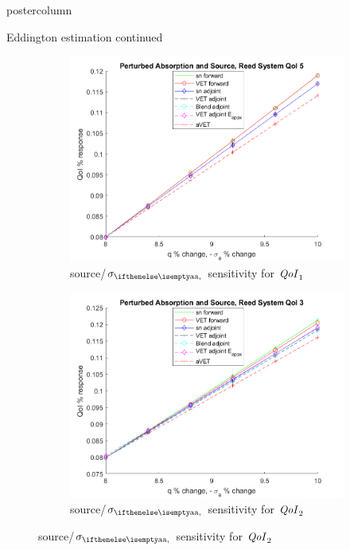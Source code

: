 \documentclass[xcolor={usenames,dvipsnames,svgnames,table}]{beamer}
\newcommand{\qoi}{{\it QoI}\xspace}
\begin{document}
\begin{frame}
\begin{columns}
\begin{column}{.33\textwidth}
\begin{beamercolorbox}[center,wd=\textwidth]{postercolumn}
\begin{minipage}[T]{0.95\textwidth}
{\begin{block}{Eddington estimation continued}
\begin{figure}[H]
\begin{subfigure}{.4\textwidth}
  \centering
  \includegraphics[width=.98\linewidth]{posterfigures/774qsigaSens.png} 
  \caption{source/$\siga$ sensitivity for $\qoi_1$}
  \label{fig:sfig5}
\end{subfigure}%
\begin{subfigure}{.4\textwidth}
  \centering
  \includegraphics[width=.98\linewidth]{posterfigures/772qsigaSens.png}
  \caption{source/$\siga$ sensitivity for $\qoi_2$}
  \label{fig:sfig4}
\end{subfigure}


\end{figure}
\end{block}}
\end{minipage}
\end{beamercolorbox}
\end{column}
\end{columns}
\end{frame}
\end{document}
